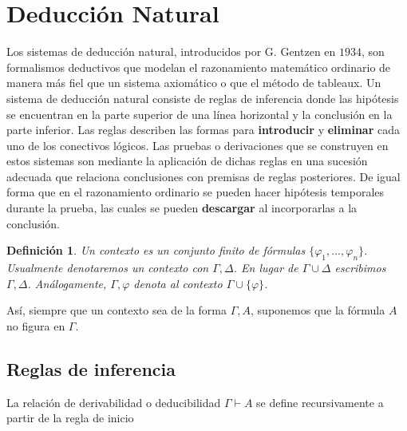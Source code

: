 \documentclass[letterpaper,11pt]{article}
\newtheorem{define}{Definición}[]
\begin{document}
    \section{Deducción Natural}
    Los sistemas de deducción natural, introducidos por G. Gentzen en $1934$,
    son formalismos deductivos que modelan el razonamiento matemático ordinario
    de manera más fiel que un sistema axiomático o que el método de tableaux.
    \newline
    Un sistema de deducción natural consiste de reglas de inferencia donde las
    hipótesis se encuentran en la parte superior de una línea horizontal y la 
    conclusión en la parte inferior. Las reglas describen las formas para 
    \textbf{introducir} y \textbf{eliminar} cada uno de los conectivos lógicos.
    Las pruebas o derivaciones que se construyen en estos sistemas son 
    mediante la aplicación de dichas reglas en una sucesión adecuada que 
    relaciona conclusiones con premisas de reglas posteriores. De igual forma
    que en el razonamiento ordinario se pueden hacer hipótesis temporales 
    durante la prueba, las cuales se pueden \textbf{descargar} al 
    incorporarlas a la conclusión.

    \begin{define}
        Un contexto es un conjunto finito de fórmulas 
        $\{ \varphi_{1},..., \varphi_{n}\}$. Usualmente denotaremos un contexto
        con $\Gamma, \Delta$. En lugar de $\Gamma \cup \Delta$ escribimos 
        $\Gamma, \Delta$. Análogamente, $\Gamma, \varphi$ denota al 
        contexto $\Gamma \cup \{ \varphi \}$.
    \end{define}

    \justify
    Así, siempre que un contexto sea de la forma $\Gamma, A$, suponemos que la 
    fórmula $A$ no figura en $\Gamma$.

    \subsection{Reglas de inferencia}
    La relación de derivabilidad o deducibilidad $\Gamma \vdash A$ se define
    recursivamente a partir de la regla de inicio
    \begin{prooftree}
        \end{prooftree}
\end{document}
